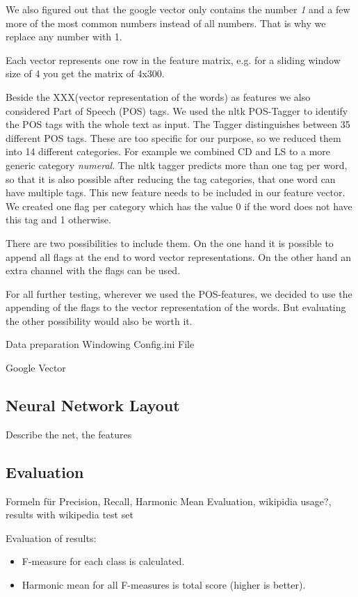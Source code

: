 We also figured out that the google vector only contains the number \emph{1} and a few more of the most common numbers instead of all numbers.
That is why we replace any number with 1.

Each vector represents one row in the feature matrix, e.g. for a sliding window size of 4 you get the matrix of 4x300.

Beside the XXX(vector representation of the words) as features we also considered Part of Speech (POS) tags.
We used the nltk POS-Tagger to identify the POS tags with the whole text as input.
The Tagger distinguishes between 35 different POS tags.
These are too specific for our purpose, so we reduced them into 14 different categories.
For example we combined CD and LS to a more generic category \emph{numeral}.
The nltk tagger predicts more than one tag per word, so that it is also possible after reducing the tag categories, that one word can have multiple tags.
This new feature needs to be included in our feature vector.
We created one flag per category which has the value 0 if the word does not have this tag and 1 otherwise.

There are two possibilities to include them. On the one hand it is possible to append all flags at the end to word vector representations.
On the other hand an extra channel with the flags can be used.

For all further testing, wherever we used the POS-features, we decided to use the appending of the flags to the vector representation of the words.
But evaluating the other possibility would also be worth it.


Data preparation
Windowing
Config.ini File


Google Vector

\subsection{Neural Network Layout}
Describe the net, the features

\subsection{Evaluation}
Formeln für Precision, Recall, Harmonic Mean
Evaluation, wikipidia usage?, results with wikipedia test set

Evaluation of results:
\begin{itemize}
\item F-measure for each class is calculated.
\item Harmonic mean for all F-measures is total score (higher is better).
\end{itemize}

